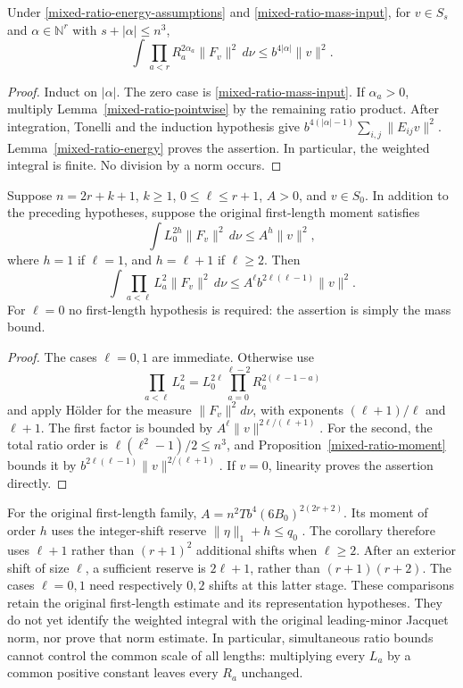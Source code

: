 \begin{proposition}\label{mixed-ratio-moment}
Under \eqref{mixed-ratio-energy-assumptions} and
\eqref{mixed-ratio-mass-input}, for $v\in S_s$ and
$\alpha\in\mathbb N^r$ with $s+|\alpha|\le n^3$,
\[
 \int\prod_{a<r}R_a^{2\alpha_a}\|F_v\|^2\,d\nu
                                  \le b^{4|\alpha|}\|v\|^2.
\]
\end{proposition}
\begin{proof}
Induct on $|\alpha|$.  The zero case is
\eqref{mixed-ratio-mass-input}.  If $\alpha_a>0$, multiply
Lemma~\ref{mixed-ratio-pointwise} by the remaining ratio product.
After integration, Tonelli and the induction hypothesis give
$b^{4(|\alpha|-1)}\sum_{i,j}\|E_{ij}v\|^2$.
Lemma~\ref{mixed-ratio-energy} proves the assertion.  In particular,
the weighted integral is finite.  No division by a norm occurs.
\end{proof}

\begin{corollary}\label{mixed-ratio-length-product}
Suppose $n=2r+k+1$, $k\ge1$, $0\le\ell\le r+1$, $A>0$, and $v\in S_0$.
In addition to the preceding hypotheses, suppose the original
first-length moment satisfies
\[
             \int L_0^{2h}\|F_v\|^2\,d\nu\le A^h\|v\|^2,
\]
where $h=1$ if $\ell=1$, and $h=\ell+1$ if $\ell\ge2$.
Then
\[
 \int\prod_{a<\ell}L_a^2\|F_v\|^2\,d\nu
                  \le A^\ell b^{2\ell(\ell-1)}\|v\|^2.
\]
For $\ell=0$ no first-length hypothesis is required: the assertion is
simply the mass bound.
\end{corollary}
\begin{proof}
The cases $\ell=0,1$ are immediate.  Otherwise use
\[
 \prod_{a<\ell}L_a^2
         =L_0^{2\ell}\prod_{a=0}^{\ell-2}R_a^{2(\ell-1-a)}
\]
and apply H\"older for the measure $\|F_v\|^2d\nu$, with exponents
$(\ell+1)/\ell$ and $\ell+1$.  The first factor is bounded by
$A^\ell\|v\|^{2\ell/(\ell+1)}$.  For the second, the total
ratio order is $\ell(\ell^2-1)/2\le n^3$, and
Proposition~\ref{mixed-ratio-moment} bounds it by
$b^{2\ell(\ell-1)}\|v\|^{2/(\ell+1)}$.  If $v=0$, linearity
proves the assertion directly.
\end{proof}

For the original first-length family,
$A=n^2Tb^4(6B_0)^{2(2r+2)}$.  Its moment of order $h$ uses the
integer-shift reserve $\|\eta\|_1+h\le q_0$
\cite{mixed-ratio-source}.  The corollary therefore uses $\ell+1$
rather than $(r+1)^2$ additional shifts when $\ell\ge2$.
After an exterior shift of size $\ell$, a sufficient reserve is
$2\ell+1$, rather than $(r+1)(r+2)$.  The cases $\ell=0,1$ need
respectively $0,2$ shifts at this latter stage.  These comparisons
retain the original first-length estimate and its representation
hypotheses.  They do not yet identify the weighted integral with the
original leading-minor Jacquet norm, nor prove that norm estimate.
In particular, simultaneous ratio bounds cannot control the common
scale of all lengths: multiplying every $L_a$ by a common positive
constant leaves every $R_a$ unchanged.
